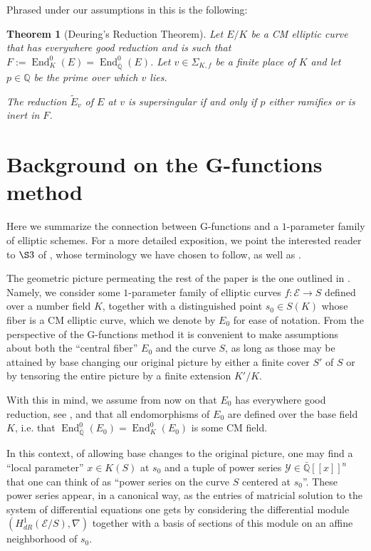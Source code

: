 \documentclass[12pt,twoside,a4paper]{article}
\theoremstyle{plain}%
\newtheorem{theorem}{Theorem}[section] %
\DeclareMathOperator{\End}{End}
\newcommand{\Q}{\mathbb{Q}}
\newcommand{\CE}{\mathcal{E}}
\begin{document}
Phrased under our assumptions in  this is the following:
\begin{theorem}[Deuring's Reduction Theorem]\label{deuringred}
	Let $E/K$ be a CM elliptic curve that has everywhere good reduction and is such that $F:=\End^{0}_K(E)=\End^{0}_{\bar{\Q}}(E)$. Let $v\in\Sigma_{K,f}$ be a finite place of $K$ and let $p\in \Q$ be the prime over which $v$ lies. 
	
The reduction $\tilde{E}_v$ of $E$ at $v$ is supersingular if and only if $p$ either ramifies or is inert in $F$.\end{theorem}


\section{Background on the G-functions method}\label{section:backgroundgfuns}

Here we summarize the connection between G-functions and a $1$-parameter family of elliptic schemes. For a more detailed exposition, we point the interested reader to $\S 3$ of \cite{papaspadicpart1}, whose terminology we have chosen to follow, as well as \cite{daworrpap}.

The geometric picture permeating the rest of the paper is the one outlined in . Namely, we consider some $1$-parameter family of elliptic curves $f:\CE\rightarrow S$ defined over a number field $K$, together with a distinguished point $s_0\in S(K)$ whose fiber is a CM elliptic curve, which we denote by $E_0$ for ease of notation. From the perspective of the G-functions method it is convenient to make assumptions about both the ``central fiber'' $E_0$ and the curve $S$, as long as those may be attained by base changing our original picture by either a finite cover $S'$ of $S$ or by tensoring the entire picture by a finite extension $K'/K$.

With this in mind, we assume from now on that $E_0$ has everywhere good reduction, see \cite{serretate}, and that all endomorphisms of $E_0$ are defined over the base field $K$, i.e. that $\End^{0}_{\bar{\Q}}(E_0)=\End^{0}_{K}(E_0)$ is some CM field. 

In this context, of allowing base changes to the original picture, one may find a ``local parameter'' $x\in K(S)$ at $s_0$ and a tuple of power series $\mathcal{Y}\in \bar{\Q}[[x]]^n$ that one can think of as ``power series on the curve $S$ centered at $s_0$''. These power series appear, in a canonical way, as the entries of matricial solution to the system of differential equations one gets by considering the differential module $(H^1_{dR}(\CE/S),\nabla)$ together with a basis of sections of this module on an affine neighborhood of $s_0$. 
\end{document}
